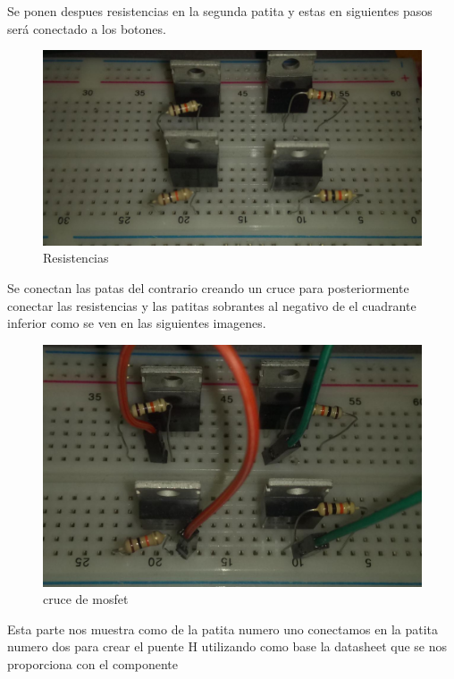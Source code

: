 \documentclass[letterpaper]{article}
\begin{document}
Se ponen despues resistencias en la segunda patita y estas en siguientes pasos será conectado a los botones.\\
\newpage
\begin{figure}[htbp]
    \centering
    \includegraphics[width=15cm]{Img/puenteH2.jpeg}
    \caption{Resistencias}
    \label{fig:my_lab2el}
\end{figure}
\newpage
Se conectan las patas del contrario creando un cruce para posteriormente conectar las resistencias y las patitas sobrantes al negativo de el cuadrante inferior como se ven en las siguientes imagenes.\\
\begin{figure}[htbp]
    \centering
    \includegraphics[width=15cm]{Img/puenteH3.jpeg}
    \caption{cruce de mosfet}
    \label{fig:my_labe1l}
\end{figure}
Esta parte nos muestra como de la patita numero uno conectamos en la patita numero dos para crear el puente H utilizando como base la datasheet que se nos proporciona con el componente\\
\end{document}
